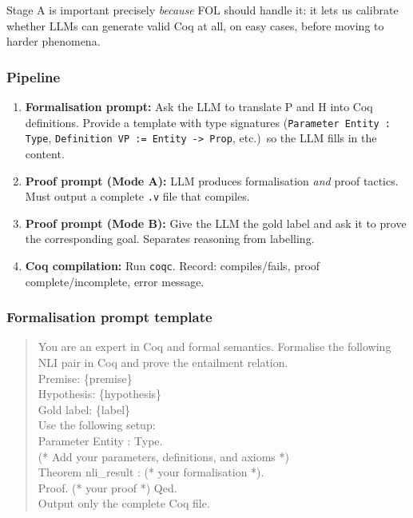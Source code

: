 \documentclass[11pt,a4paper]{article}
\begin{document}
Stage A is important precisely \emph{because} FOL should handle it: it lets us calibrate whether LLMs can generate valid Coq at all, on easy cases, before moving to harder phenomena.

\subsubsection{Pipeline}

\begin{enumerate}[nosep,leftmargin=1.5em]
\item \textbf{Formalisation prompt:} Ask the LLM to translate P and H into Coq definitions. Provide a template with type signatures (\texttt{Parameter Entity : Type}, \texttt{Definition VP := Entity -> Prop}, etc.)\ so the LLM fills in the content.
\item \textbf{Proof prompt (Mode A):} LLM produces formalisation \emph{and} proof tactics. Must output a complete \texttt{.v} file that compiles.
\item \textbf{Proof prompt (Mode B):} Give the LLM the gold label and ask it to prove the corresponding goal. Separates reasoning from labelling.
\item \textbf{Coq compilation:} Run \texttt{coqc}. Record: compiles/fails, proof complete/incomplete, error message.
\end{enumerate}

\subsubsection{Formalisation prompt template}

\begin{quote}\small\ttfamily
You are an expert in Coq and formal semantics. Formalise the following NLI pair in Coq and prove the entailment relation.\\[2pt]
Premise: \{premise\}\\
Hypothesis: \{hypothesis\}\\
Gold label: \{label\}\\[2pt]
Use the following setup:\\
Parameter Entity : Type.\\
(* Add your parameters, definitions, and axioms *)\\[2pt]
Theorem nli\_result : (* your formalisation *).\\
Proof. (* your proof *) Qed.\\[2pt]
Output only the complete Coq file.
\end{quote}
\end{document}
